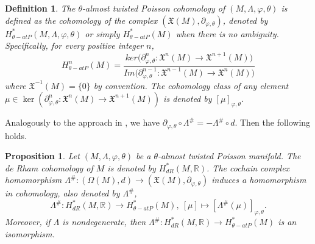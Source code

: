 \documentclass[a4paper,10pt]{article}
\numberwithin{equation}{section}
\theoremstyle{plain}
\newtheorem{proposition}[theorem]{Proposition}
\newtheorem{definition}[theorem]{Definition}
\begin{document}
			
			\begin{definition}  The $\theta$-almost twisted Poisson cohomology of $(M,\Lambda,\varphi,\theta)$ is defined as the cohomology of the complex $(\mathfrak{X}(M), \partial_{\varphi,\theta})$, denoted by $H_{\theta-atP}^{*}(M,\Lambda,\varphi,\theta)$ or simply $H_{\theta-atP}^{*}(M)$ when there is no ambiguity. Specifically, for every positive integer $n$,
				\begin{equation}\label{t4}
					H_{\theta-atP}^{n}(M)=\dfrac{ker\Big(\partial_{\varphi,\theta}^{n}:\mathfrak{X}^{n}(M)\to \mathfrak{X}^{n+1}(M)\Big)}{Im\Big(\partial_{\varphi,\theta}^{n-1}:
						\mathfrak{X}^{n-1}(M)\to \mathfrak{X}^{n}(M)\Big)}
				\end{equation}
				where $\mathfrak{X}^{-1}(M)=\{0\}$ by convention. The cohomology class of any element $\mu \in \ker(\partial_{\varphi,\theta}^{n}:\mathfrak{X}^{n}(M)\to \mathfrak{X}^{n+1}(M))$ is denoted by $[\mu]_{\varphi,\theta}$.		
			\end{definition}
			
			Analogously to the approach in \cite[pages 41-43]{R19}, we have $\partial_{\varphi,\theta}\circ \Lambda^{\#}=-\Lambda^{\#}\circ d$. Then the following holds.
			\begin{proposition} Let $(M,\Lambda,\varphi,\theta)$ be a $\theta$-almost twisted Poisson manifold. The de Rham cohomology of $M$ is denoted by $H_{dR}^{*}(M,\mathbb{R})$. The cochain complex homomorphism $\Lambda^{\#}: (\Omega(M),d)\longrightarrow (\mathfrak{X}(M), \partial_{\varphi,\theta})$ induces a homomorphism in cohomology, also denoted by $\Lambda^{\#}$,
				\begin{equation}\label{ex1}
					\Lambda^{\#}: H_{dR}^{*}(M,\mathbb{R}) \longrightarrow  H_{\theta-atP}^{*}(M),\
					[\mu] \longmapsto [\Lambda^{\#}(\mu)]_{\varphi,\theta}.
				\end{equation}
				Moreover, if $\Lambda$ is nondegenerate, then $\Lambda^{\#}: H_{dR}^{*}(M,\mathbb{R}) \longrightarrow  H_{\theta-atP}^{*}(M)$ is an isomorphism.
			\end{proposition}
\end{document}
